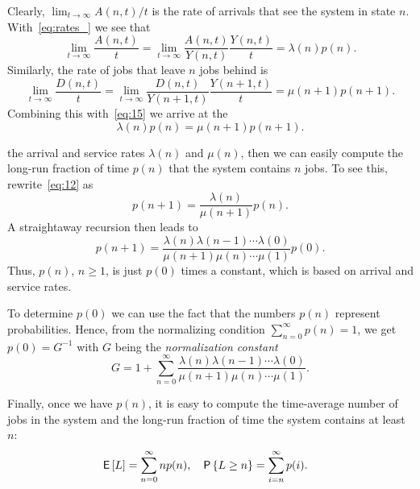 Clearly, $\lim_{t\to\infty} A(n,t)/ t$ is the rate of arrivals that see the system in state $n$. With~\cref{eq:rates_} we see that
\begin{equation*}
\lim_{t\to\infty} \frac{A(n,t)}t = \lim_{t\to\infty} \frac{A(n,t)}{Y(n,t)}\frac{Y(n,t)}t = \lambda(n) p(n).
\end{equation*}
Similarly, the rate of jobs that leave $n$ jobs behind is
\begin{equation*}
\lim_{t\to\infty} \frac{D(n,t)}t = \lim_{t\to\infty} \frac{D(n,t)}{Y(n+1,t)}\frac{Y(n+1,t)}t = \mu(n+1) p(n+1).
\end{equation*}
Combining this with~\cref{eq:15} we arrive at the 
\begin{equation}\label{eq:12}
 \lambda(n) p(n) = \mu(n+1)p(n+1).
\end{equation}


 the arrival and service rates $\lambda(n)$ and $\mu(n)$,
then we can easily compute the long-run fraction of time $p(n)$ that the system contains $n$ jobs.
To see this, rewrite~\cref{eq:12} as
\begin{equation}\label{eq:25}
 p(n+1) = \frac{\lambda(n)}{\mu(n+1)}p(n).
\end{equation}
A straightaway recursion then leads to
\begin{equation*}
 p(n+1) = \frac{\lambda(n)\lambda(n-1)\cdots \lambda(0)}{\mu(n+1)\mu(n)\cdots \mu(1)}p(0).
\end{equation*}
Thus, $p(n)$, $n\geq 1$, is just $p(0)$ times a constant, which is based on  arrival and service rates.

To determine $p(0)$ we can use the fact that the numbers $p(n)$ represent probabilities.
Hence, from the normalizing condition $\sum_{n=0}^\infty p(n)=1$, we get $p(0) = G^{-1}$ with
$G$ being the \emph{normalization constant}
\begin{equation} \label{eq:20}
G = 1+\sum_{n=0}^\infty \frac{\lambda(n)\lambda(n-1)\cdots\lambda(0)}{\mu(n+1)\mu(n)\cdots \mu(1)}.
\end{equation}

Finally, once we have $p(n)$, it is easy to compute  the time-average number of jobs in the system and the long-run fraction of time the system contains at least $n$:
\begin{align*}
\,\mathsf{E}\left[L\right] &= \sum_{n=0}^\infty n p(n), & \,\mathsf{P}\left\{L \geq n\right\} &= \sum_{i=n}^\infty p(i).
\end{align*}


